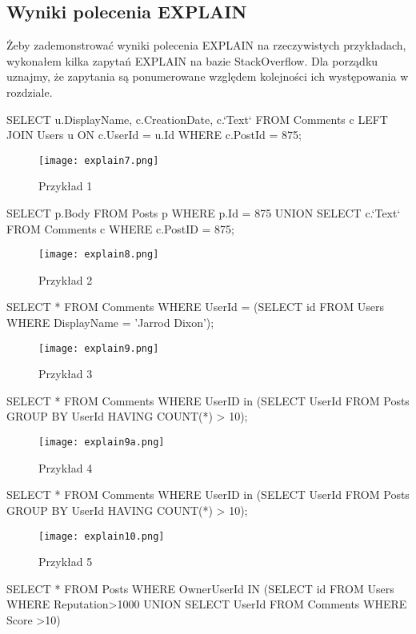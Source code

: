 \subsection{Wyniki polecenia EXPLAIN}
Żeby zademonstrować wyniki polecenia EXPLAIN na rzeczywistych przykładach, wykonałem kilka zapytań EXPLAIN na bazie StackOverflow. Dla porządku uznajmy, że zapytania są ponumerowane względem kolejności ich występowania w rozdziale.
\begin{spverbatim}
	SELECT u.DisplayName, c.CreationDate, c.`Text` FROM  Comments c LEFT JOIN Users u ON c.UserId = u.Id WHERE c.PostId = 875;
\end{spverbatim}
\begin{figure}[H]
	\texttt{[image: explain7.png]} 
	\caption{Przykład 1}
\end{figure}
\begin{spverbatim}
	SELECT p.Body FROM Posts p WHERE p.Id = 875 UNION
	SELECT c.`Text` FROM Comments c WHERE c.PostID = 875;
\end{spverbatim}
\begin{figure}[H]
	\texttt{[image: explain8.png]} 
	\caption{Przykład 2}
\end{figure}
\begin{spverbatim}
	SELECT * FROM Comments WHERE UserId = (SELECT id FROM Users WHERE DisplayName = 'Jarrod Dixon');
\end{spverbatim}
\begin{figure}[H]
	\texttt{[image: explain9.png]} 
	\caption{Przykład 3}
\end{figure}
\begin{spverbatim}
	SELECT * FROM Comments WHERE UserID in (SELECT UserId FROM Posts GROUP BY UserId HAVING COUNT(*) > 10);
\end{spverbatim}
\begin{figure}[H]
	\texttt{[image: explain9a.png]} 
	\caption{Przykład 4}
\end{figure}
\begin{spverbatim}
	SELECT * FROM Comments WHERE UserID in (SELECT UserId FROM Posts GROUP BY UserId HAVING COUNT(*) > 10);
\end{spverbatim}
\begin{figure}[H]
	\texttt{[image: explain10.png]} 
	\caption{Przykład 5}
\end{figure}
\begin{spverbatim}
	SELECT * FROM Posts  WHERE OwnerUserId IN (SELECT id FROM Users WHERE Reputation>1000 UNION SELECT UserId FROM Comments WHERE Score >10)
\end{spverbatim}
